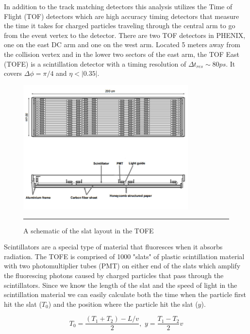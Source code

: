 In addition to the track matching detectors this analysis utilizes the Time of Flight (TOF) detectors which are high accuracy timing detectors that measure the time it takes for charged particles traveling through the central arm to go from the event vertex to the detector\citep{TOFfocus}. There are two TOF detectors in PHENIX, one on the east DC arm and one on the west arm. Located 5 meters away from the collision vertex and in the lower two sectors of the east arm, the TOF East (TOFE) is a scintillation detector with a timing resolution of $\Delta t_{res} \sim 80 ps$. It covers $\Delta\phi = \pi / 4$ and $\eta < |0.35|$. 

\begin{figure}[htbp]
  \centering
    \includegraphics[width=0.8\textwidth]{Figures/TOFEschematic.jpg}
    \rule{35em}{0.5pt}
  \caption[A schematic of the slat layout in the TOFE]{A schematic of the slat layout in the TOFE}
  \label{fig:TOFEschematic}
\end{figure}

Scintillators are a special type of material that fluoresces when it absorbs radiation. The TOFE is comprised of 1000 "slats" of plastic scintillation material with two photomultiplier tubes (PMT) on either end of the slats which amplify the fluorescing photons caused by charged particles that pass through the scintillators. Since we know the length of the slat and the speed of light in the scintillation material we can easily calculate both the time when the particle first hit the slat ($T_{0}$) and the position where the particle hit the slat ($y$).

\begin{equation}
T_{0} = \frac{(T_{1}+T_{2})-L/v}{2} , \, \, y = \frac{T_{1}-T_{2}}{2} v
\end{equation}

